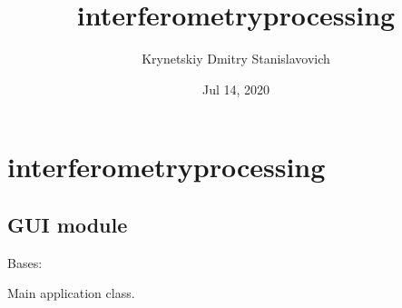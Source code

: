 \documentclass[letterpaper,10pt,english]{sphinxmanual}
\title{interferometry\sphinxhyphen{}processing}
\date{Jul 14, 2020}
\author{Krynetskiy Dmitry Stanislavovich}
\begin{document}
\pagestyle{empty}
\sphinxmaketitle
\pagestyle{plain}
\sphinxtableofcontents
\pagestyle{normal}
\label{\detokenize{index::doc}}



\chapter{interferometry\sphinxhyphen{}processing}
\label{\detokenize{modules:interferometry-processing}}\label{\detokenize{modules::doc}}

\section{GUI module}
\label{\detokenize{GUI:module-GUI}}\label{\detokenize{GUI:gui-module}}\label{\detokenize{GUI::doc}}

\begin{fulllineitems}
\label{\detokenize{GUI:GUI.MyApp}}
Bases: 

Main application class.

\end{fulllineitems}

\end{document}
